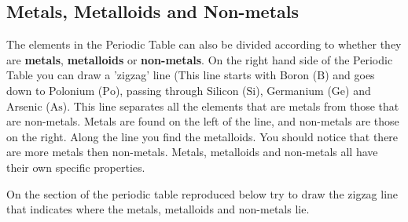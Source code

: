             \subsection{ Metals, Metalloids and Non-metals}
            \nopagebreak
      \label{m38708*id65693}The elements in the Periodic Table can also be divided according to whether they are \textbf{metals}, \textbf{metalloids} or \textbf{non-metals}. On the right hand side of the Periodic Table you can draw a 'zigzag' line (This line starts with Boron ($\mathrm{B}$) and goes down to Polonium ($\mathrm{Po}$), passing through Silicon ($\mathrm{Si}$), Germanium ($\mathrm{Ge}$) and Arsenic ($\mathrm{As}$). This line separates all the elements that are metals from those that are non-metals. Metals are found on the left of the line, and non-metals are those on the right. Along the line you find the metalloids. You should notice that there are more metals then non-metals. Metals, metalloids and non-metals all have their own specific properties.\par 
On the section of the periodic table reproduced below try to draw the zigzag line that indicates where the metals, metalloids and non-metals lie. \par
